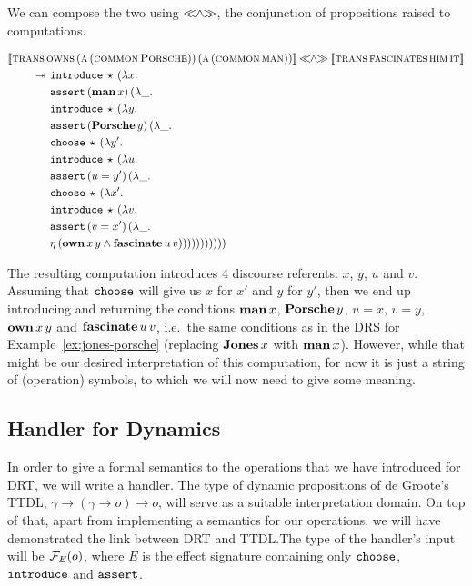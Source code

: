 We can compose the two using $\mathbin{\ll\!\!\land\!\!\gg}$, the conjunction of propositions
raised to computations.

\begin{align*}
  \llbracket \textsc{trans}\,&\textsc{owns}\,(\textsc{a}\,(\textsc{common}\,\textsc{Porsche}))\,(\textsc{a}\,(\textsc{common}\,\textsc{man})) \rrbracket \mathbin{\ll\!\!\land\!\!\gg} \llbracket \textsc{trans}\,\textsc{fascinates}\,\textsc{him}\,\textsc{it} \rrbracket \\
  \twoheadrightarrow &\ \mathtt{introduce}\,\star\,(\lambda x.\,  \\
       &\ \mathtt{assert}\,(\textbf{man}\,x)\,(\lambda \_.\,  \\
       &\ \mathtt{introduce}\,\star\,(\lambda y.\,  \\
       &\ \mathtt{assert}\,(\textbf{Porsche}\,y)\,(\lambda \_.\,  \\
       &\ \mathtt{choose}\,\star\,(\lambda y'.\,  \\
       &\ \mathtt{introduce}\,\star\,(\lambda u.\,  \\
       &\ \mathtt{assert}\,(u = y')\,(\lambda \_.\,  \\
       &\ \mathtt{choose}\,\star\,(\lambda x'.\,  \\
       &\ \mathtt{introduce}\,\star\,(\lambda v.\,  \\
       &\ \mathtt{assert}\,(v = x')\,(\lambda \_.\,  \\
       &\ \eta\,(\textbf{own}\,x\,y \land \textbf{fascinate}\,u\,v)))))))))))
\end{align*}

The resulting computation introduces 4 discourse referents: $x$, $y$, $u$
and $v$. Assuming that $\mathtt{choose}$ will give us $x$ for $x'$ and $y$ for
$y'$, then we end up introducing and returning the conditions
$\textbf{man}\,x$, $\textbf{Porsche}\,y$, $u = x$, $v = y$,
$\textbf{own}\,x\,y$ and $\textbf{fascinate}\,u\,v$, i.e.\ the same
conditions as in the DRS for Example~\ref{ex:jones-porsche} (replacing
$\textbf{Jones}\,x$ with $\textbf{man}\,x$). However, while that might
be our desired interpretation of this computation, for now it is just a
string of (operation) symbols, to which we will now need to give some
meaning.


\subsection{Handler for Dynamics}
\label{ssec:handler-for-dynamics}

In order to give a formal semantics to the operations that we have
introduced for DRT, we will write a handler. The type of dynamic
propositions of de Groote's TTDL, $\gamma \to (\gamma \to o) \to o$, will
serve as a suitable interpretation domain. On top of that, apart from
implementing a semantics for our operations, we will have demonstrated the
link between DRT and TTDL.\@ The type of the handler's input will be
$\mathcal{F}_E(o)$, where $E$ is the effect signature containing only
$\mathtt{choose}$, $\mathtt{introduce}$ and $\mathtt{assert}$.

